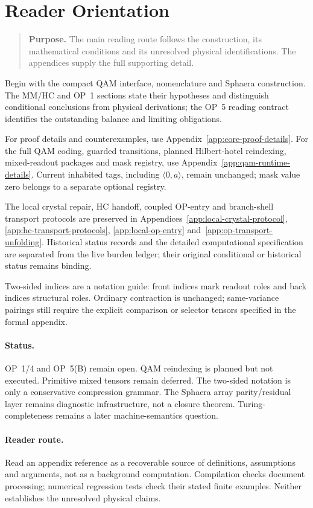 \clearpage
\tableofcontents
\clearpage

\section*{Reader Orientation}
\begin{quote}\small
\noindent\textbf{Purpose.} The main reading route follows the construction, its mathematical conditions and its unresolved physical identifications. The appendices supply the full supporting detail.
\end{quote}

Begin with the compact QAM interface, nomenclature and Sphaera construction. The MM/HC and OP~1 sections state their hypotheses and distinguish conditional conclusions from physical derivations; the OP~5 reading contract identifies the outstanding balance and limiting obligations.

For proof details and counterexamples, use Appendix~\ref{app:core-proof-details}. For the full QAM coding, guarded transitions, planned Hilbert-hotel reindexing, mixed-readout packages and mask registry, use Appendix~\ref{app:qam-runtime-details}. Current inhabited tags, including $\langle0,a\rangle$, remain unchanged; mask value zero belongs to a separate optional registry.

The local crystal repair, HC handoff, coupled OP-entry and branch-shell transport protocols are preserved in Appendices~\ref{app:local-crystal-protocol}, \ref{app:hc-transport-protocols}, \ref{app:local-op-entry} and~\ref{app:op-transport-unfolding}. Historical status records and the detailed computational specification are separated from the live burden ledger; their original conditional or historical status remains binding.

Two-sided indices are a notation guide: front indices mark readout roles and back indices structural roles. Ordinary contraction is unchanged; same-variance pairings still require the explicit comparison or selector tensors specified in the formal appendix.

\paragraph{Status.}
OP~1/4 and OP~5(B) remain open. QAM reindexing is planned but not executed. Primitive mixed tensors remain deferred. The two-sided notation is only a conservative compression grammar. The Sphaera array parity/residual layer remains diagnostic infrastructure, not a closure theorem. Turing-completeness remains a later machine-semantics question.

\paragraph{Reader route.}
Read an appendix reference as a recoverable source of definitions, assumptions and arguments, not as a background computation. Compilation checks document processing; numerical regression tests check their stated finite examples. Neither establishes the unresolved physical claims.

\clearpage
